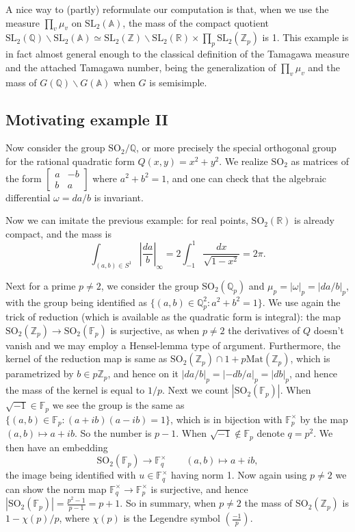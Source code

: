 	A nice way to (partly) reformulate our computation is that, when we use the measure $\prod_v \mu_v$ on $\mathrm{SL}_2(\mathbb{A})$, the mass of the compact quotient $\mathrm{SL}_2(\mathbb{Q})\backslash \mathrm{SL}_2(\mathbb{A}) \simeq \mathrm{SL}_2(\mathbb{Z})\backslash \mathrm{SL}_2(\mathbb{R}) \times \prod_p \mathrm{SL}_2(\mathbb{Z}_p)$ is 1. This example is in fact almost general enough to the classical definition of the Tamagawa measure and the attached Tamagawa number, being the generalization of $\prod_v \mu_v$ and the mass of $G(\mathbb{Q})\backslash G(\mathbb A)$ when $G$ is semisimple. 
	
	
\subsection{Motivating example II}
\label{subsection-example2}
	Now consider the group $\mathrm{SO}_2/\mathbb{Q}$, or more precisely the special orthogonal group for the rational quadratic form $Q(x,y)=x^2+y^2$. We realize $\mathrm{SO}_2$ as matrices of the form 
	$\left[\begin{matrix}
	a& -b \\ b&a
	\end{matrix}\right]$ where $a^2+b^2=1$, and one can check that the algebraic differential $\omega = da/b$ is invariant. 
	
	Now we can imitate the previous example: for real points, $\mathrm{SO}_2(\mathbb{R})$ is already compact, and the mass is 
	\[\int_{(a,b)\in S^1}\left|\frac{da}{b}\right|_\infty = 2\int_{-1}^1 \frac{dx}{\sqrt{1-x^2}} = 2\pi.\]
	
	Next for a prime $p\ne 2$, we consider the group $\mathrm{SO}_2(\mathbb{Q}_p)$ and $\mu_p = |\omega|_p=|da/b|_p$, with the group being identified as $\{(a,b)\in \mathbb{Q}_p^2:a^2+b^2=1\}$. We use again the trick of reduction (which is available as the quadratic form is integral): the map $\mathrm{SO}_2(\mathbb{Z}_p)\to \mathrm{SO}_2(\mathbb{F}_p)$ is surjective, as when $p\ne 2$ the derivatives of $Q$ doesn't vanish and we may employ a Hensel-lemma type of argument. Furthermore, the kernel of the reduction map is same as $\mathrm{SO}_2(\mathbb{Z}_p)\cap 1+p\mathrm{Mat}(\mathbb{Z}_p)$, which is parametrized by $b\in p\mathbb{Z}_p$, and hence on it $|da/b|_p = |-db/a|_p = |db|_p$, and hence the mass of the kernel is equal to $1/p$. Next we count $|\mathrm{SO}_2(\mathbb{F}_p)|$. When $\sqrt{-1} \in \mathbb{F}_p$ we see the group is the same as 
	$\{(a,b)\in \mathbb{F}_p: (a+ib)(a-ib)=1\}$,
	which is in bijection with $\mathbb{F}_p^\times$ by the map $(a,b) \mapsto a+ib$. So the number is $p-1$. When $\sqrt{-1}\notin \mathbb{F}_p$ denote $q= p^2$. We then have an embedding 
	\[\mathrm{SO}_2(\mathbb{F}_p) \to \mathbb{F}_q^\times \qquad (a,b)\longmapsto a+ib,\]
	the image being identified with $u\in \mathbb{F}_q^\times$ having norm 1. Now again using $p\ne 2$ we can show the norm map $\mathbb{F}_q^\times \to \mathbb{F}_p^\times$ is surjective, and hence $|\mathrm{SO}_2(\mathbb{F}_p)| = \frac{p^2-1}{p-1}=p+1$. So in summary, when $p\ne 2$ the mass of $\mathrm{SO}_2(\mathbb{Z}_p)$ is $1-\chi(p)/p$, where $\chi(p)$ is the Legendre symbol $(\frac{-1}{p})$.
	
